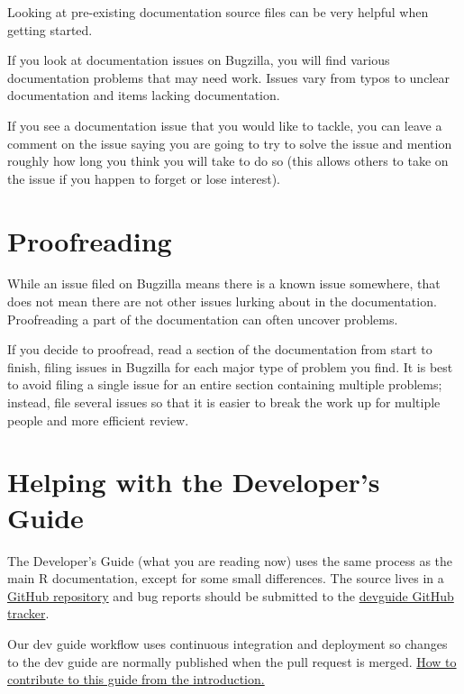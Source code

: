 \documentclass[
]{book}
\begin{document}
Looking at pre-existing documentation source files can be very helpful when getting started.

If you look at documentation issues on Bugzilla, you will find various documentation problems that may need work. Issues vary from typos to unclear documentation and items lacking documentation.

If you see a documentation issue that you would like to tackle, you can leave a comment on the issue saying you are going to try to solve the issue and mention roughly how long you think you will take to do so (this allows others to take on the issue if you happen to forget or lose interest).

\hypertarget{proofreading}{%
\section{Proofreading}\label{proofreading}}

While an issue filed on Bugzilla means there is a known issue somewhere, that does not mean there are not other issues lurking about in the documentation. Proofreading a part of the documentation can often uncover problems.

If you decide to proofread, read a section of the documentation from start to finish, filing issues in Bugzilla for each major type of problem you find. It is best to avoid filing a single issue for an entire section containing multiple problems; instead, file several issues so that it is easier to break the work up for multiple people and more efficient review.

\hypertarget{helping-with-the-developers-guide}{%
\section{Helping with the Developer's Guide}\label{helping-with-the-developers-guide}}

The Developer's Guide (what you are reading now) uses the same process as the main R documentation, except for some small differences. The source lives in a \href{https://github.com/r-devel/rdevguide/}{GitHub repository} and bug reports should be submitted to the \href{https://github.com/r-devel/rdevguide/issues}{devguide GitHub tracker}.

Our dev guide workflow uses continuous integration and deployment so changes to the dev guide are normally published when the pull request is merged. \protect\hyperlink{how-to-contribute-to-this-guide}{How to contribute to this guide from the introduction.}
\end{document}
